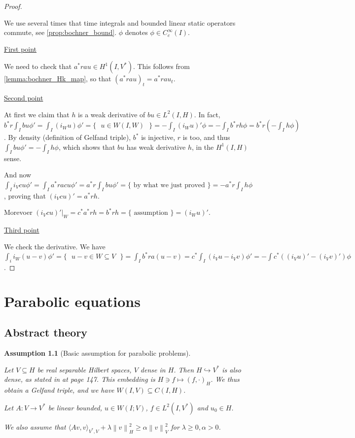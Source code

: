 \documentclass[english,a4paper,10pt,oneside]{scrbook}	%
\theoremstyle{break}
\newtheorem{ass}[equation]{Assumption}
\newenvironment{mproof}[1][\proofname]{%
  \begin{proof}[#1]$ $\par\nobreak\ignorespaces
}{%
  \end{proof}
}
\renewcommand*{\proofname}{Proof}
\theoremstyle{remark}
\newcommand{\norm}[1]{\left\lVert#1\right\rVert}
\newcommand{\HN}[1]{\norm{#1}_{H}}
\newcommand{\VN}[1]{\norm{#1}_{V}}
\newcommand{\ind}[1]{\{\text{ #1 }\}}
\newcommand{\mind}[1]{$#1$}
\begin{document}
\begin{mproof}

We use several times that time integrals and bounded linear static operators commute, see \cref{prop:bochner_bound}. $\phi$ denotes $\phi \in C^\infty_c(I)$.

\underline{First point}

We need to check that $a^* r a u \in H^1(I, V^*)$. This follows from \cref{lemma:bochner_Hk_map}, so that $(a^* r a u)_t = a^* r a u_t$.

\underline{Second point}

At first we claim that $h$ is a weak derivative of $bu \in L^2(I,H)$. In fact, $b^* r \int_I bu \phi' = \int_I (i_W u)\phi' = \ind{\mind{u \in W(I,W)}} =-\int_I(i_Wu)'\phi=-\int_I b^*r h\phi = b^*r (-\int_I h \phi)$. By density (definition of Gelfand triple), $b^*$ is injective, $r$ is too, and thus $\int_I bu \phi' = -\int_I h \phi$, which shows that $bu$ has weak derivative $h$, in the $H^1(I,H)$ sense.

And now $\int_I i_V c u \phi'= \int_I a^*racu \phi' = a^*r\int_I bu\phi' = \ind{by what we just proved}=-a^*r \int_I h \phi$, proving that $(i_V cu)'=a^*r h$.

Morevoer $(i_V cu)'|_W = c^*a^*r h=b^*rh=\ind{assumption} = (i_W u)'$.

\underline{Third point}

We check the derivative. We have $\int_i i_W(u-v)\phi' =\ind{\mind{u-v \in W\subseteq V}} = \int_I b^* r a (u-v) = c^*\int_I(i_Vu - i_Vv)\phi' = -\int c^*((i_V u)'- (i_V v)')\phi$.

\end{mproof}

\chapter{Parabolic equations}
\label{chap:parab_eq}

\section{Abstract theory}

\begin{ass}[Basic assumption for parabolic problems]
\label{ass:basic_par}

Let $V\subseteq H$ be real separable Hilbert spaces, $V$ dense in $H$. Then $H\hookrightarrow V^*$ is also dense, as stated in \cite{trol} at page 147. This embedding is $H \ni f \mapsto (f, \cdot )_H$. We thus obtain a Gelfand triple, and we have $W(I,V)\subseteq C(I,H)$.

Let $A:V\rightarrow V^* $ be linear bounded, $u \in W(I;V)$, $f \in L^2(I,V^*)$ and $u_0 \in H$.

We also assume that $\langle Av, v \rangle_{V^*,V}+ \lambda \HN{v}^2\geq \alpha \VN{v}^2$ for $\lambda \geq 0, \alpha >0$.
\end{ass}
\end{document}
